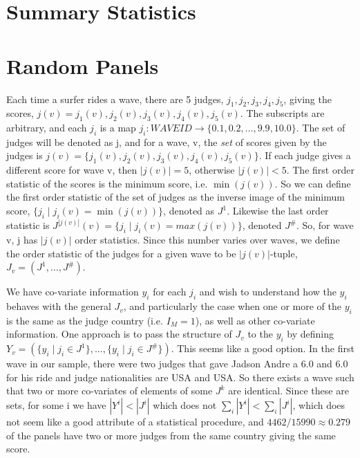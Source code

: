 \documentclass{article}
\begin{document}
\section{Summary Statistics}



\section{Random Panels}

Each time a surfer rides a wave, there are 5 judges, $j_1,j_2,j_3,j_4,j_5$, giving the scores, $j(v)=j_1(v),j_2(v),j_3(v),j_4(v),j_5(v)$. The subscripts are arbitrary, and each $j_i$ is a map $j_i:WAVEID \rightarrow \{0.1,0.2,\dots,9.9,10.0\}$. The set of judges will be denoted as j, and for a wave, v, the \textit{set} of scores given by the judges is $j(v) = \{j_1(v),j_2(v),j_3(v),j_4(v),j_5(v)\}$. If each judge gives a different score for wave v, then $|j(v)| = 5$, otherwise $|j(v)| < 5$. The first order statistic of the scores is the minimum score, i.e. $\min(j(v))$. So we can define the first order statistic of the set of judges as the inverse image of the minimum score, $\{j_i \mid j_i(v) = \min(j(v))\}$, denoted as $J^1$. Likewise the last order statistic is $J^{|j(v)|}(v) = \{ j_i \mid j_i(v) = max(j(v))\}$, denoted $J^\#$. So, for wave v, j has $|j(v)|$ order statistics. Since this number varies over waves, we define the order statistic of the judges for a given wave to be $|j(v)|$-tuple, $J_v = (J^1,\dots,J^\#)$.

We have co-variate information $y_i$ for each $j_i$ and wish to understand how the $y_i$ behaves with the general $J_v$, and particularly the case when one or more of the $y_i$ is the same as the judge country (i.e. $I_M = 1$), as well as other co-variate information. One approach is to pass the structure of $J_v$ to the $y_i$ by defining $ Y_v = (\{y_i \mid j_i \in J^1\}, \dots, \{y_i \mid j_i \in J^\#\})$. This seems like a good option. In the first wave in our sample, there were two judges that gave Jadson Andre a 6.0 and 6.0 for his ride and judge nationalities are USA and USA. So there exists a wave such that two or more co-variates of elements of some $J^k$ are identical. Since these are sets, for some i we have $|Y^i|<|J^i|$ which does not $\sum_i |Y^i| < \sum_i |J^i|$, which does not seem like a good attribute of a statistical procedure, and $4462/15990 \approx 0.279$ of the panels have two or more judges from the same country giving the same score.
\end{document}
